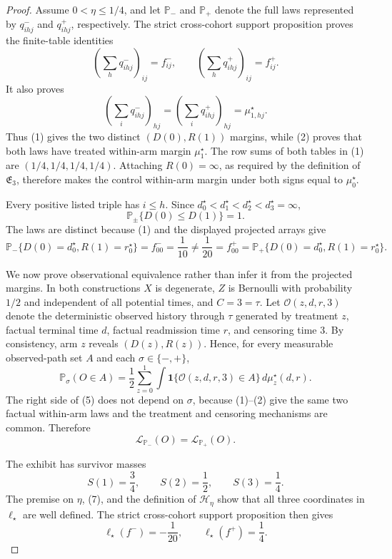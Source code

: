 \documentclass{article}
\begin{document}
\begin{proof}
Assume \(0<\eta\leq1/4\), and let \(\mathbb P_-\) and \(\mathbb P_+\) denote the full laws represented by \(q^-_{ihj}\) and \(q^+_{ihj}\), respectively.  The strict cross-cohort support proposition proves the finite-table identities
\[
 \left(\sum_hq^-_{ihj}\right)_{ij}=f^-_{ij},\qquad
 \left(\sum_hq^+_{ihj}\right)_{ij}=f^+_{ij}. \tag{1}
\]
It also proves
\[
 \left(\sum_iq^-_{ihj}\right)_{hj}
 =\left(\sum_iq^+_{ihj}\right)_{hj}
 =\mu_{1,hj}^\star. \tag{2}
\]
Thus (1) gives the two distinct \((D(0),R(1))\) margins, while (2) proves that both laws have treated within-arm margin \(\mu_1^\star\).  The row sums of both tables in (1) are \((1/4,1/4,1/4,1/4)\).  Attaching \(R(0)=\infty\), as required by the definition of \(\mathfrak E_3\), therefore makes the control within-arm margin under both signs equal to \(\mu_0^\star\).

Every positive listed triple has \(i\leq h\).  Since \(d_0^\star<d_1^\star<d_2^\star<d_3^\star=\infty\),
\[
 \mathbb P_\pm\{D(0)\leq D(1)\}=1. \tag{3}
\]
The laws are distinct because (1) and the displayed projected arrays give
\[
 \mathbb P_-\{D(0)=d_0^\star,R(1)=r_0^\star\}
 =f^-_{00}=\frac1{10}
 \neq\frac1{20}=f^+_{00}
 =\mathbb P_+\{D(0)=d_0^\star,R(1)=r_0^\star\}. \tag{4}
\]

We now prove observational equivalence rather than infer it from the projected margins.  In both constructions \(X\) is degenerate, \(Z\) is Bernoulli with probability \(1/2\) and independent of all potential times, and \(C=3=\tau\).  Let \(\mathcal O(z,d,r,3)\) denote the deterministic observed history through \(\tau\) generated by treatment \(z\), factual terminal time \(d\), factual readmission time \(r\), and censoring time \(3\).  By consistency, arm \(z\) reveals \((D(z),R(z))\).  Hence, for every measurable observed-path set \(A\) and each \(\sigma\in\{-,+\}\),
\[
 \mathbb P_\sigma(O\in A)
 =\frac12\sum_{z=0}^1
 \int\mathbf 1\{\mathcal O(z,d,r,3)\in A\}\,
 d\mu_z^\star(d,r). \tag{5}
\]
The right side of (5) does not depend on \(\sigma\), because (1)--(2) give the same two factual within-arm laws and the treatment and censoring mechanisms are common.  Therefore
\[
 \mathcal L_{\mathbb P_-}(O)=\mathcal L_{\mathbb P_+}(O). \tag{6}
\]

The exhibit has survivor masses
\[
 S(1)=\frac34,\qquad S(2)=\frac12,\qquad S(3)=\frac14. \tag{7}
\]
The premise on \(\eta\), (7), and the definition of \(\mathcal H_\eta\) show that all three coordinates in \(\ell_\star\) are well defined.  The strict cross-cohort support proposition then gives
\[
 \ell_\star(f^-)=-\frac1{20},\qquad
 \ell_\star(f^+)=\frac14. \tag{8}
\]


\end{proof}
\end{document}
